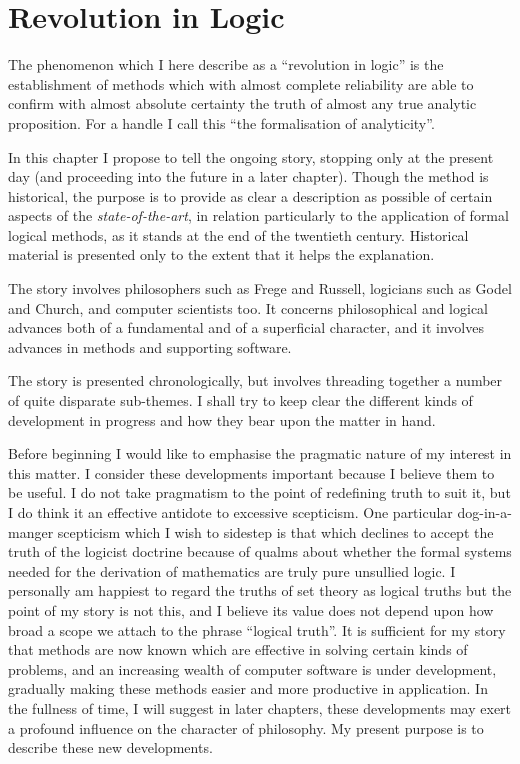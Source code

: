 \chapter{Revolution in Logic}\label{RevolutionInLogic}

The phenomenon which I here describe as a ``revolution in logic'' is the establishment of methods which with almost complete reliability are able to confirm with almost absolute certainty the truth of almost any true analytic proposition.
For a handle I call this ``the formalisation of analyticity''.

In this chapter I propose to tell the ongoing story, stopping only at the present day (and proceeding into the future in a later chapter).
Though the method is historical, the purpose is to provide as clear a description as possible of certain aspects of the {\it state-of-the-art}, in relation particularly to the application of formal logical methods, as it stands at the end of the twentieth century.
Historical material is presented only to the extent that it helps the explanation.

The story involves philosophers such as Frege and Russell, logicians such as Godel and Church, and computer scientists too.
It concerns philosophical and logical advances both of a fundamental and of a superficial character, and it involves advances in methods and supporting software.

The story is presented chronologically, but involves threading together a number of quite disparate sub-themes.
I shall try to keep clear the different kinds of development in progress and how they bear upon the matter in hand.

Before beginning I would like to emphasise the pragmatic nature of my interest in this matter.
I consider these developments important because I believe them to be useful.
I do not take pragmatism to the point of redefining truth to suit it, but I do think it an effective antidote to excessive scepticism.
One particular dog-in-a-manger scepticism which I wish to sidestep is that which declines to accept the truth of the logicist doctrine because of qualms about whether the formal systems needed for the derivation of mathematics are truly pure unsullied logic.
I personally am happiest to regard the truths of set theory as logical truths but the point of my story is not this, and I believe its value does not depend upon how broad a scope we attach to the phrase ``logical truth''.
It is sufficient for my story that methods are now known which are effective in solving certain kinds of problems, and an increasing wealth of computer software is under development, gradually making these methods easier and more productive in application.
In the fullness of time, I will suggest in later chapters, these developments may exert a profound influence on the character of philosophy.
My present purpose is to describe these new developments.

